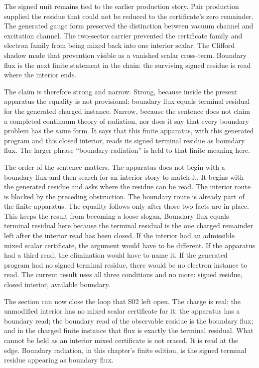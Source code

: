 The signed unit remains tied to the earlier production story. Pair production
supplied the residue that could not be reduced to the certificate's zero
remainder. The generated gauge form preserved the distinction between vacuum
channel and excitation channel. The two-sector carrier prevented the
certificate family and electron family from being mixed back into one interior
scalar. The Clifford shadow made that prevention visible as a vanished scalar
cross-term. Boundary flux is the next finite statement in the chain: the
surviving signed residue is read where the interior ends.

The claim is therefore strong and narrow. Strong, because inside the present
apparatus the equality is not provisional: boundary flux equals terminal
residual for the generated charged instance. Narrow, because the sentence does
not claim a completed continuum theory of radiation, nor does it say that every
boundary problem has the same form. It says that this finite apparatus, with
this generated program and this closed interior, reads its signed terminal
residue as boundary flux. The larger phrase ``boundary radiation'' is held to
that finite meaning here.

The order of the sentence matters. The apparatus does not begin with a boundary
flux and then search for an interior story to match it. It begins with the
generated residue and asks where the residue can be read. The interior route is
blocked by the preceding obstruction. The boundary route is already part of the
finite apparatus. The equality follows only after those two facts are in place.
This keeps the result from becoming a loose slogan. Boundary flux equals
terminal residual here because the terminal residual is the one charged
remainder left after the interior read has been closed. If the interior had an
admissible mixed scalar certificate, the argument would have to be different.
If the apparatus had a third read, the elimination would have to name it. If
the generated program had no signed terminal residue, there would be no electron
instance to read. The current result uses all three conditions and no more:
signed residue, closed interior, available boundary.

The section can now close the loop that S02 left open. The charge is real; the
unmodified interior has no mixed scalar certificate for it; the apparatus has a
boundary read; the boundary read of the observable residue is the boundary
flux; and in the charged finite instance that flux is exactly the terminal
residual. What cannot be held as an interior mixed certificate is not erased. It
is read at the edge. Boundary radiation, in this chapter's finite edition, is
the signed terminal residue appearing as boundary flux.

